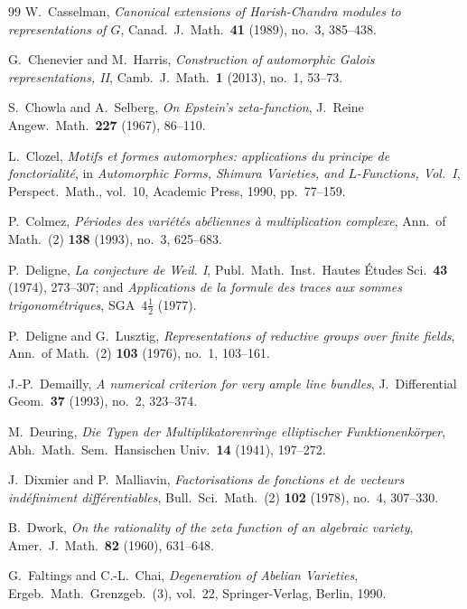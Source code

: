 \begin{thebibliography}{99}
W.~Casselman,
\emph{Canonical extensions of Harish-Chandra modules to representations of $G$},
Canad.\ J.\ Math.\ \textbf{41} (1989), no.~3, 385--438.

G.~Chenevier and M.~Harris,
\emph{Construction of automorphic Galois representations, II},
Camb.\ J.\ Math.\ \textbf{1} (2013), no.~1, 53--73.

S.~Chowla and A.~Selberg,
\emph{On Epstein's zeta-function},
J.\ Reine Angew.\ Math.\ \textbf{227} (1967), 86--110.

L.~Clozel,
\emph{Motifs et formes automorphes: applications du principe de fonctorialit\'e},
in \emph{Automorphic Forms, Shimura Varieties, and $L$-Functions, Vol.~I}, Perspect.\ Math., vol.~10, Academic Press, 1990, pp.~77--159.

P.~Colmez,
\emph{P\'eriodes des vari\'et\'es ab\'eliennes \`a multiplication complexe},
Ann.\ of Math.\ (2) \textbf{138} (1993), no.~3, 625--683.

P.~Deligne,
\emph{La conjecture de Weil. I},
Publ.\ Math.\ Inst.\ Hautes \'Etudes Sci.\ \textbf{43} (1974), 273--307; and \emph{Applications de la formule des traces aux sommes trigonom\'etriques}, SGA~$4\frac{1}{2}$ (1977).

P.~Deligne and G.~Lusztig,
\emph{Representations of reductive groups over finite fields},
Ann.\ of Math.\ (2) \textbf{103} (1976), no.~1, 103--161.

J.-P.~Demailly,
\emph{A numerical criterion for very ample line bundles},
J.\ Differential Geom.\ \textbf{37} (1993), no.~2, 323--374.

M.~Deuring,
\emph{Die Typen der Multiplikatorenringe elliptischer Funktionenk\"orper},
Abh.\ Math.\ Sem.\ Hansischen Univ.\ \textbf{14} (1941), 197--272.

J.~Dixmier and P.~Malliavin,
\emph{Factorisations de fonctions et de vecteurs ind\'efiniment diff\'erentiables},
Bull.\ Sci.\ Math.\ (2) \textbf{102} (1978), no.~4, 307--330.

B.~Dwork,
\emph{On the rationality of the zeta function of an algebraic variety},
Amer.\ J.\ Math.\ \textbf{82} (1960), 631--648.

G.~Faltings and C.-L.~Chai,
\emph{Degeneration of Abelian Varieties},
Ergeb.\ Math.\ Grenzgeb.\ (3), vol.~22, Springer-Verlag, Berlin, 1990.


\end{thebibliography}
